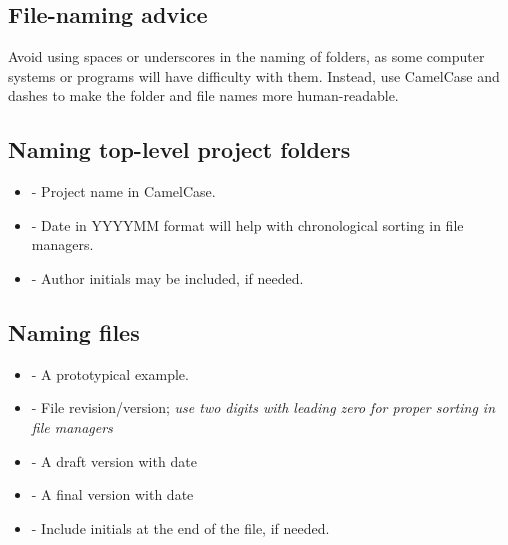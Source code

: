 \subsection{File-naming advice}

Avoid using spaces or underscores in the naming of folders, as some computer systems or programs will have difficulty with them. Instead, use CamelCase and dashes to make the folder and file names more human-readable.

\subsection{Naming top-level project folders}

\begin{itemize}
\item {} 

\hspace{.25cm} - Project name in CamelCase.

\item {} 

\hspace{.25cm} - Date in YYYYMM format will help with chronological sorting in file managers.

\item {} 

\hspace{.25cm} - Author initials may be included, if needed.
\end{itemize}

\subsection{Naming files}


\begin{itemize}

\item {} 

\hspace{.25cm} - A prototypical example.

\item {} 

\hspace{.25cm} - File revision/version; \emph{use two digits with leading zero for proper sorting in file managers}

\item {} 

\hspace{.25cm} - A draft version with date

\item {} 

\hspace{.25cm} - A final version with date

\item {} 

\hspace{.25cm} - Include initials at the end of the file, if needed.

\end{itemize}

